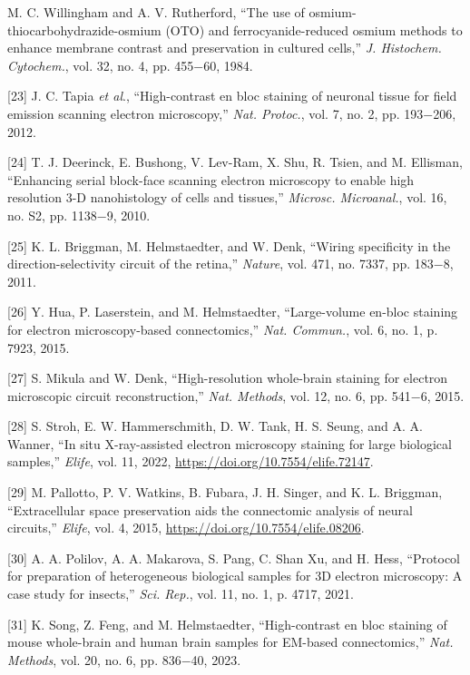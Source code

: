 \documentclass{article}
\begin{document}
\begin{hangpars}
[22] M. C. Willingham and A. V. Rutherford, “The use of osmium-thiocarbohydrazide-osmium (OTO) and ferrocyanide-reduced osmium methods to enhance membrane contrast and preservation in cultured cells,” \emph{J. Histochem. Cytochem.}, vol. 32, no. 4, pp. 455−60, 1984.

[23] J. C. Tapia \emph{et al}., “High-contrast en bloc staining of neuronal tissue for field emission scanning electron microscopy,” \emph{Nat. Protoc.}, vol. 7, no. 2, pp. 193−206, 2012.

[24] T. J. Deerinck, E. Bushong, V. Lev-Ram, X. Shu, R. Tsien, and M. Ellisman, “Enhancing serial block-face scanning electron microscopy to enable high resolution 3-D nanohistology of cells and tissues,” \emph{Microsc. Microanal.}, vol. 16, no. S2, pp. 1138−9, 2010.

[25] K. L. Briggman, M. Helmstaedter, and W. Denk, “Wiring specificity in the direction-selectivity circuit of the retina,” \emph{Nature}, vol. 471, no. 7337, pp. 183−8, 2011.

[26] Y. Hua, P. Laserstein, and M. Helmstaedter, “Large-volume en-bloc staining for electron microscopy-based connectomics,” \emph{Nat. Commun.}, vol. 6, no. 1, p. 7923, 2015.

[27] S. Mikula and W. Denk, “High-resolution whole-brain staining for electron microscopic circuit reconstruction,” \emph{Nat. Methods}, vol. 12, no. 6, pp. 541−6, 2015.

[28] S. Stroh, E. W. Hammerschmith, D. W. Tank, H. S. Seung, and A. A. Wanner, “In situ X-ray-assisted electron microscopy staining for large biological samples,” \emph{Elife}, vol. 11, 2022, \url{https://doi.org/10.7554/elife.72147}.

[29] M. Pallotto, P. V. Watkins, B. Fubara, J. H. Singer, and K. L. Briggman, “Extracellular space preservation aids the connectomic analysis of neural circuits,” \emph{Elife}, vol. 4, 2015, \url{https://doi.org/10.7554/elife.08206}.

[30] A. A. Polilov, A. A. Makarova, S. Pang, C. Shan Xu, and H. Hess, “Protocol for preparation of heterogeneous biological samples for 3D electron microscopy: A case study for insects,” \emph{Sci. Rep.}, vol. 11, no. 1, p. 4717, 2021.

[31] K. Song, Z. Feng, and M. Helmstaedter, “High-contrast en bloc staining of mouse whole-brain and human brain samples for EM-based connectomics,” \emph{Nat. Methods}, vol. 20, no. 6, pp. 836−40, 2023.


\end{hangpars}
\end{document}
